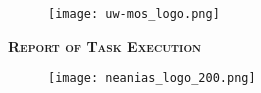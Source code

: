 \begin{titlepage}

\begin{center}

\vspace*{3.0cm}

\begin{figure}[h]
\begin{center}
\texttt{[image: uw-mos\_logo.png]}
\end{center}
\end{figure}
\vspace{0.9cm}

\begin{spacing}{2.5}
{\Huge \textsc{\textbf{Report of Task Execution}}}
\end{spacing}
\vspace{4.0cm}



\singlespacing


\begin{figure}[h]
\begin{center}
\texttt{[image: neanias\_logo\_200.png]}
\end{center}
\end{figure}


\end{center}

\end{titlepage}

\tableofcontents
\clearpage
